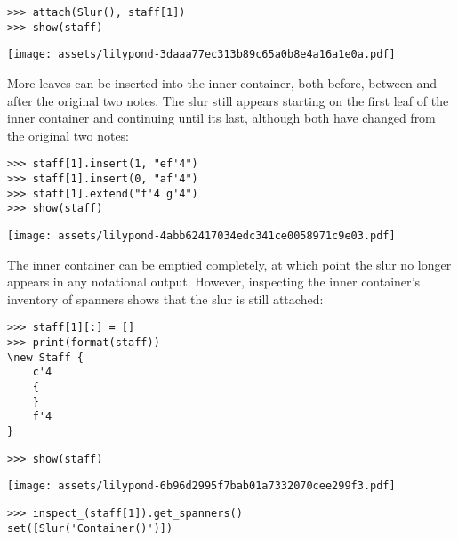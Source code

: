 \begin{abjadbookoutput}
\begin{singlespacing}
\vspace{-0.5\baselineskip}
\begin{lstlisting}
>>> attach(Slur(), staff[1])
>>> show(staff)
\end{lstlisting}
\noindent\texttt{[image: assets/lilypond-3daaa77ec313b89c65a0b8e4a16a1e0a.pdf]}
\end{singlespacing}
\end{abjadbookoutput}

\noindent More leaves can be inserted into the inner container, both before,
between and after the original two notes. The slur still appears starting on
the first leaf of the inner container and continuing until its last, although
both have changed from the original two notes:

\begin{comment}
<abjad>
staff[1].insert(1, "ef'4")
staff[1].insert(0, "af'4")
staff[1].extend("f'4 g'4")
show(staff)
</abjad>
\end{comment}

\begin{abjadbookoutput}
\begin{singlespacing}
\vspace{-0.5\baselineskip}
\begin{lstlisting}
>>> staff[1].insert(1, "ef'4")
>>> staff[1].insert(0, "af'4")
>>> staff[1].extend("f'4 g'4")
>>> show(staff)
\end{lstlisting}
\noindent\texttt{[image: assets/lilypond-4abb62417034edc341ce0058971c9e03.pdf]}
\end{singlespacing}
\end{abjadbookoutput}

\noindent The inner container can be emptied completely, at which point the
slur no longer appears in any notational output. However, inspecting the inner
container's inventory of spanners shows that the slur is still attached:

\begin{comment}
<abjad>
staff[1][:] = []
print(format(staff))
show(staff)
inspect_(staff[1]).get_spanners()
</abjad>
\end{comment}

\begin{abjadbookoutput}
\begin{singlespacing}
\vspace{-0.5\baselineskip}
\begin{lstlisting}
>>> staff[1][:] = []
>>> print(format(staff))
\new Staff {
    c'4
    {
    }
    f'4
}
\end{lstlisting}
\begin{lstlisting}
>>> show(staff)
\end{lstlisting}
\noindent\texttt{[image: assets/lilypond-6b96d2995f7bab01a7332070cee299f3.pdf]}
\begin{lstlisting}
>>> inspect_(staff[1]).get_spanners()
set([Slur('Container()')])
\end{lstlisting}
\end{singlespacing}
\end{abjadbookoutput}


